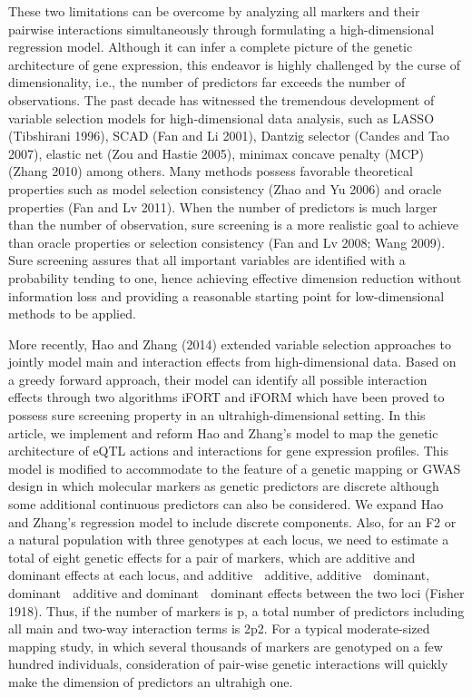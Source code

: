 \documentclass[]{book}
\theoremstyle{definition}
\theoremstyle{definition}
\theoremstyle{remark}
\begin{document}
These two limitations can be overcome by analyzing all markers and their
pairwise interactions simultaneously through formulating a
high-dimensional regression model. Although it can infer a complete
picture of the genetic architecture of gene expression, this endeavor is
highly challenged by the curse of dimensionality, i.e., the number of
predictors far exceeds the number of observations. The past decade has
witnessed the tremendous development of variable selection models for
high-dimensional data analysis, such as LASSO (Tibshirani 1996), SCAD
(Fan and Li 2001), Dantzig selector (Candes and Tao 2007), elastic net
(Zou and Hastie 2005), minimax concave penalty (MCP) (Zhang 2010) among
others. Many methods possess favorable theoretical properties such as
model selection consistency (Zhao and Yu 2006) and oracle properties
(Fan and Lv 2011). When the number of predictors is much larger than the
number of observation, sure screening is a more realistic goal to
achieve than oracle properties or selection consistency (Fan and Lv
2008; Wang 2009). Sure screening assures that all important variables
are identified with a probability tending to one, hence achieving
effective dimension reduction without information loss and providing a
reasonable starting point for low-dimensional methods to be applied.

More recently, Hao and Zhang (2014) extended variable selection
approaches to jointly model main and interaction effects from
high-dimensional data. Based on a greedy forward approach, their model
can identify all possible interaction effects through two algorithms
iFORT and iFORM which have been proved to possess sure screening
property in an ultrahigh-dimensional setting. In this article, we
implement and reform Hao and Zhang's model to map the genetic
architecture of eQTL actions and interactions for gene expression
profiles. This model is modified to accommodate to the feature of a
genetic mapping or GWAS design in which molecular markers as genetic
predictors are discrete although some additional continuous predictors
can also be considered. We expand Hao and Zhang's regression model to
include discrete components. Also, for an F2 or a natural population
with three genotypes at each locus, we need to estimate a total of eight
genetic effects for a pair of markers, which are additive and dominant
effects at each locus, and additive  additive, additive  dominant,
dominant  additive and dominant  dominant effects between the two loci
(Fisher 1918). Thus, if the number of markers is p, a total number of
predictors including all main and two-way interaction terms is 2p2. For
a typical moderate-sized mapping study, in which several thousands of
markers are genotyped on a few hundred individuals, consideration of
pair-wise genetic interactions will quickly make the dimension of
predictors an ultrahigh one.
\end{document}
